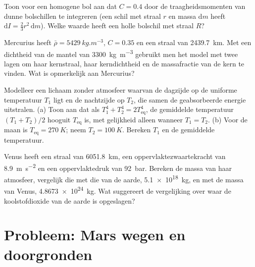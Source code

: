 \begin{exercise}[$\star\star$]\label{exo:b1:comparative-planetology:9}
Toon voor een homogene bol aan dat $C = 0.4$ door de traagheidsmomenten van dunne bolschillen te integreren (een
schil met straal $r$ en massa $\mathrm dm$ heeft $\mathrm dI = \tfrac23 r^2\,\mathrm dm$). Welke waarde heeft een
holle bolschil met straal $R$?
\end{exercise}

\begin{exercise}[$\star\star\star$]\label{exo:b1:comparative-planetology:10}
Mercurius heeft $\bar\rho = \qty{5429}{kg.m^{-3}}$, $C = 0.35$ en een straal van \qty{2439.7}{km}. Met een
dichtheid van de mantel van \qty{3300}{kg.m^{-3}} gebruikt men het model met twee lagen om haar kernstraal, haar
kerndichtheid en de massafractie van de kern te vinden. Wat is opmerkelijk aan Mercurius?
\end{exercise}

\begin{exercise}[$\star\star\star$]\label{exo:b1:comparative-planetology:11}
Modelleer een lichaam zonder atmosfeer waarvan de dagzijde op de uniforme temperatuur $T_1$ ligt en de nachtzijde op
$T_2$, die samen de geabsorbeerde energie uitstralen. (a) Toon aan dat als $T_1^4 + T_2^4 = 2T_\mathrm{eq}^4$, de
gemiddelde temperatuur $(T_1 + T_2)/2$ hooguit $T_\mathrm{eq}$ is, met gelijkheid alleen wanneer $T_1 = T_2$. (b) Voor de
maan is $T_\mathrm{eq} = \qty{270}{K}$; neem $T_2 = \qty{100}{K}$. Bereken $T_1$ en de gemiddelde temperatuur.
\end{exercise}

\begin{exercise}[$\star\star\star$]\label{exo:b1:comparative-planetology:12}
Venus heeft een straal van \qty{6051.8}{km}, een oppervlaktezwaartekracht van \qty{8.9}{m.s^{-2}} en een
oppervlaktedruk van \qty{92}{bar}. Bereken de massa van haar atmosfeer, vergelijk die met die van de aarde,
\qty{5.1e18}{kg}, en met de massa van Venus, \qty{4.8673e24}{kg}. Wat suggereert de vergelijking over waar de
koolstofdioxide van de aarde is opgeslagen?
\end{exercise}

\section{Probleem: Mars wegen en doorgronden}

